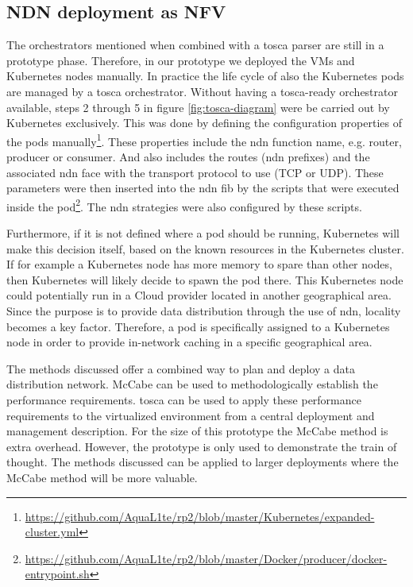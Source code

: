 \documentclass[conference]{IEEEtran}
\begin{document}
\subsection{NDN deployment as NFV}
The orchestrators mentioned when combined with a \gls{tosca} parser are still in a prototype phase. Therefore, in our prototype we deployed the VMs and Kubernetes nodes manually. In practice the life cycle of also the Kubernetes pods are managed by a \gls{tosca} orchestrator. Without having a \gls{tosca}-ready orchestrator available, steps 2 through 5 in figure \ref{fig:tosca-diagram} were be carried out by Kubernetes exclusively. This was done by defining the configuration properties of the pods manually\footnote{\url{https://github.com/AquaL1te/rp2/blob/master/Kubernetes/expanded-cluster.yml}}. These properties include the \gls{ndn} function name, e.g. router, producer or consumer. And also includes the routes (\gls{ndn} prefixes) and the associated \gls{ndn} face with the transport protocol to use (TCP or UDP). These parameters were then inserted into the \gls{ndn} \gls{fib} by the scripts that were executed inside the pod\footnote{\url{https://github.com/AquaL1te/rp2/blob/master/Docker/producer/docker-entrypoint.sh}}. The \gls{ndn} strategies were also configured by these scripts.

Furthermore, if it is not defined where a pod should be running, Kubernetes will make this decision itself, based on the known resources in the Kubernetes cluster. If for example a Kubernetes node has more memory to spare than other nodes, then Kubernetes will likely decide to spawn the pod there. This Kubernetes node could potentially run in a Cloud provider located in another geographical area. Since the purpose is to provide data distribution through the use of \gls{ndn}, locality becomes a key factor. Therefore, a pod is specifically assigned to a Kubernetes node in order to provide in-network caching in a specific geographical area.

The methods discussed offer a combined way to plan and deploy a data distribution network. McCabe can be used to methodologically establish the performance requirements. \gls{tosca} can be used to apply these performance requirements to the virtualized environment from a central deployment and management description. For the size of this prototype the McCabe method is extra overhead. However, the prototype is only used to demonstrate the train of thought. The methods discussed can be applied to larger deployments where the McCabe method will be more valuable.
\end{document}
